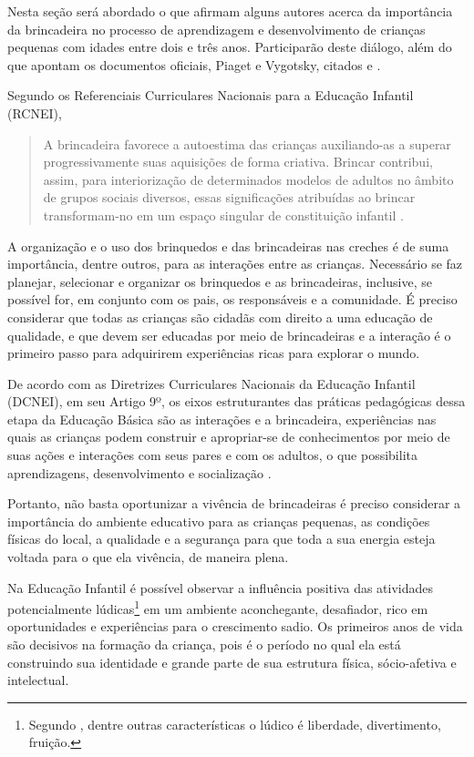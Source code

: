 \begin{refsection}
    Nesta seção será abordado o que afirmam alguns autores acerca da importância da brincadeira no processo de aprendizagem e desenvolvimento de crianças pequenas com idades entre dois e três anos. Participarão deste diálogo, além do que apontam os documentos oficiais, Piaget e Vygotsky, citados \textcite{KISHIMOTO1999Jogo, KISHIMOTO2002Brincar} e \textcite{MALUF2003Brincar}. 

    Segundo os Referenciais Curriculares Nacionais para a Educação Infantil (RCNEI),  

    \begin{quotation}
        A brincadeira favorece a autoestima das crianças auxiliando-as a superar progressivamente suas aquisições de forma criativa. Brincar contribui, assim, para interiorização de determinados modelos de adultos no âmbito de grupos sociais diversos, essas significações atribuídas ao brincar transformam-no em um espaço singular de constituição infantil \cite[p.~27]{RCN2001}. 
    \end{quotation}

    A organização e o uso dos brinquedos e das brincadeiras nas creches é de suma importância, dentre outros, para as interações entre as crianças. Necessário se faz planejar, selecionar e organizar os brinquedos e as brincadeiras, inclusive, se possível for, em conjunto com os pais, os responsáveis e a comunidade. É preciso considerar que todas as crianças são cidadãs com direito a uma educação de qualidade, e que devem ser educadas por meio de brincadeiras e a interação é o primeiro passo para adquirirem experiências ricas para explorar o mundo. 

    De acordo com as Diretrizes Curriculares Nacionais da Educação Infantil (DCNEI), em seu Artigo 9º, os eixos estruturantes das práticas pedagógicas dessa etapa da Educação Básica são as interações e a brincadeira, experiências nas quais as crianças podem construir e apropriar-se de conhecimentos por meio de suas ações e interações com seus pares e com os adultos, o que possibilita aprendizagens, desenvolvimento e socialização \cite{DCN2009}. 

    Portanto, não basta oportunizar a vivência de brincadeiras é preciso considerar a importância do ambiente educativo para as crianças pequenas, as condições físicas do local, a qualidade e a segurança para que toda a sua energia esteja voltada para o que ela vivência, de maneira plena. 

    Na Educação Infantil é possível observar a influência positiva das atividades potencialmente lúdicas\footnote{Segundo \textcite{HUIZINGA1990Homo}, dentre outras características o lúdico é liberdade, divertimento, fruição.} em um ambiente aconchegante, desafiador, rico em oportunidades e experiências para o crescimento sadio. Os primeiros anos de vida são decisivos na formação da criança, pois é o período no qual ela está construindo sua identidade e grande parte de sua estrutura física, sócio-afetiva e intelectual. 


\end{refsection}
